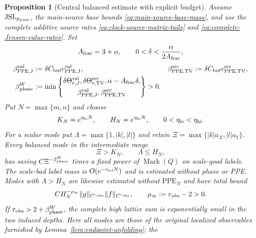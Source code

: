 \documentclass[11pt]{article}
\newtheorem{proposition}[theorem]{Proposition}
\begin{document}
\begin{proposition}[Central balanced estimate with explicit budget]
\label{prop:central-phase-verification}
Assume $\mathrm{JSL}_{p_{\rm joint}}$, the main-source base bounds
\eqref{eq:main-source-base-mass}, and use
the complete additive source rates
\eqref{eq:clock-source-matrix-tails} and
\eqref{eq:complete-Jensen-value-rates}.  Set
\[
 A_{\rm frac}=3+\alpha,\qquad
 0<\delta<\frac{\alpha}{2A_{\rm frac}},
\]
\begin{equation}
\label{eq:complete-phase-exponent}
\begin{aligned}
 \beta_{\rm PPE,J}^{\rm val}&:=
   \delta C_{\rm buf}c_{\rm PPE,J}^{\rm val},
 &\beta_{\rm PPE,TV}^{\rm src}&:=
   \delta C_{\rm buf}c_{\rm PPE,TV}^{\rm src},\\
 \beta_{\rm phase}^{W}&:=
 \min\left\{
 \begin{gathered}
  \delta\Theta_{r,J}^{\rm val},
  \delta\Theta_{r,\rm TV}^{\rm src},
  \alpha-A_{\rm frac}\delta,\\
  \beta_{\rm PPE,J}^{\rm val},
  \beta_{\rm PPE,TV}^{\rm src}
 \end{gathered}
 \right\}>0.
\end{aligned}
\end{equation}
Put $N=\max\{m,n\}$ and choose
\begin{equation}
\label{eq:three-frequency-cutoffs}
 K_N=e^{\eta_{\rm lo}N},\qquad
 H_N=e^{\eta_{\rm hi}N},\qquad
 0<\eta_{\rm lo}<\eta_{\rm hi}.
\end{equation}
For a scalar mode put
$\Lambda=\max\{1,|k|,|l|\}$ and retain
$\Xi=\max\{|k|a_X,|l|a_Y\}$.  Every balanced mode in the intermediate range
\begin{equation}
\label{eq:intermediate-phase-range}
 \Xi>K_N,\qquad \Lambda\le H_N,
\end{equation}
has saving \(C\Xi^{-\beta_{\rm phase}^{W}}\) times a fixed power of
\(\operatorname{Mark}(Q)\) on scale-good labels.  The scale-bad label mass is
$O(e^{-c_{\rm scl}N})$ and is estimated without phase or PPE.  Modes with
$\Lambda>H_N$ are likewise estimated without
$\mathrm{PPE}_{N}$ and have total bound
\begin{equation}
\label{eq:ultra-high-observable-tail}
 C H_N^{-\rho_\infty}\|g\|_{C^{r_{\rm obs}}}
 \|f\|_{C^{r_{\rm obs}}},\qquad
 \rho_\infty:=r_{\rm obs}-2>0.
\end{equation}
If $r_{\rm obs}>2+\beta_{\rm phase}^{W}$, the complete high lattice sum is
exponentially small in the two induced depths.  Here all modes are those of the original
localized observables furnished by Lemma~\ref{lem:endpoint-unfolding}; the

\end{proposition}
\end{document}

